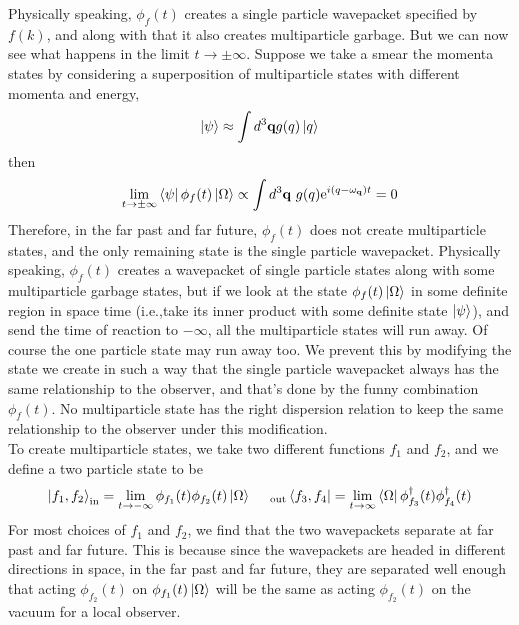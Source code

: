 \documentclass[11pt, notitlepage]{report}
\newcommand{\e}{\mathrm{e}}
\newcommand{\w}{\omega}
\numberwithin{equation}{section}
\begin{document}
Physically speaking, \(\phi_f(t)\) creates a single particle wavepacket specified by \(f(k)\), and along with that it also creates multiparticle garbage. But we can now see what happens in the limit \(t\to \pm \infty\). Suppose we take a smear the momenta states by considering a superposition of multiparticle states with different momenta and energy, 
\begin{equation*}
    \ket{\psi} \approx \int d^3\textbf{q} g(q) \ket{q}
\end{equation*}
then 
\begin{equation*}
    \lim_{t\to \pm\infty} \bra{\psi}\phi_f(t)\ket{\Omega} \propto \int d^3\textbf{q}~ g(q)\e^{i(q - \w_\textbf{q})t} = 0 
\end{equation*}
Therefore, in the far past and far future, \(\phi_f(t)\) does not create multiparticle states, and the only remaining state is the single particle wavepacket. Physically speaking, \(\phi_f(t)\) creates a wavepacket of single particle states along with some multiparticle garbage states, but if we look at the state \(\phi_f(t)\ket{\Omega}\) in some definite region in space time (i.e.,take its inner product with some definite state \(\ket\psi\)), and send the time of reaction to \(-\infty\), all the multiparticle states will run away. Of course the one particle state may run away too. We prevent this by modifying the state we create in such a way that the single particle wavepacket always has the same relationship to the observer, and that's done by the funny combination \(\phi_f(t)\). No multiparticle state has the right dispersion relation to keep the same relationship to the observer under this modification. \\

To create multiparticle states, we take two different functions \(f_1\) and \(f_2\), and we define a two particle state to be 
\begin{equation*}
    \ket{f_1, f_2}_{\text{in}} = \lim_{t\to -\infty} \phi_{f_1}(t)\phi_{f_2}(t) \ket{\Omega}~~~~{}_{\text{out}}\bra{f_3, f_4} = \lim_{t\to \infty} \bra{\Omega}\phi_{f_3}^\dagger(t)\phi^\dagger_{f_4}(t) 
\end{equation*}
For most choices of \(f_1\) and \(f_2\), we find that the two wavepackets separate at far past and far future. This is because since the wavepackets are headed in different directions in space, in the far past and far future, they are separated well enough that acting \(\phi_{f_2}(t)\) on \(\phi_{f_1}(t)\ket{\Omega}\) will be the same as acting \(\phi_{f_2}(t)\) on the vacuum for a local observer. \\
\end{document}
